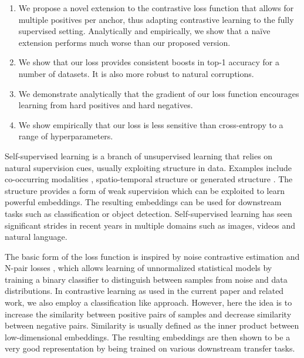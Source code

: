 \begin{enumerate}[leftmargin=*,topsep=0pt,itemsep=-1ex,partopsep=1ex,parsep=1ex]
    \item We propose a novel extension to the contrastive loss function that allows for multiple positives per anchor, thus adapting contrastive learning to the fully supervised setting. Analytically and empirically, we show that a na{\"i}ve extension performs much worse than our proposed version.
    \item We show that our loss provides consistent boosts in top-1 accuracy for a number of datasets. It is also more robust to natural corruptions.
    \item We demonstrate analytically that the gradient of our loss function encourages learning from hard positives and hard negatives. %
    \item We show empirically that our loss is less sensitive than cross-entropy to a range of hyperparameters. %
\end{enumerate}
\vspace{-10pt}

Self-supervised learning is a branch of unsupervised learning that relies on natural supervision cues, usually exploiting structure in data. Examples include co-occurring modalities \cite{sun2019videobert,arandjelovic2017look,tian2019contrastive}, spatio-temporal structure \cite{henaff2019data,devlin2018bert} or generated structure \cite{hjelm2018learning}. The structure provides a form of weak supervision which can be exploited to learn powerful embeddings.  The resulting embeddings can be used for downstream tasks such as classification or object detection. Self-supervised learning has seen significant strides in recent years in multiple domains such as images, videos and natural language. 

The basic form of the loss function is inspired by noise contrastive estimation \cite{gutmann2010noise} and N-pair losses \cite{sohn2016improved}, which allows learning of unnormalized statistical models by training a binary classifier to distinguish between samples from noise and data distributions. In contrastive learning as used in the current paper and related work, we also employ a classification like approach. However, here the idea is to increase the similarity between positive pairs of samples and decrease similarity between negative pairs. Similarity is usually defined as the inner product between low-dimensional embeddings. The resulting embeddings are then shown to be a very good representation by being trained on various downstream transfer tasks. 

